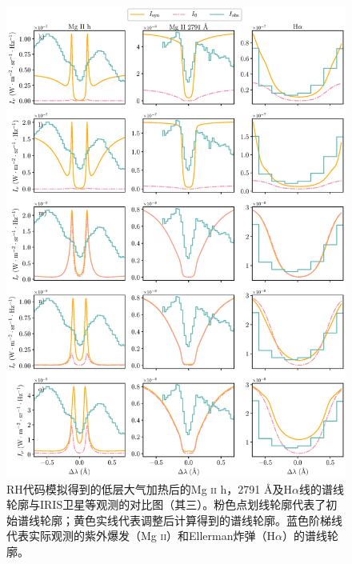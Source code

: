 \begin{figure}
	\centering
	\includegraphics[width=\textwidth]{figs/UVB_spec_3}
	\caption{RH代码模拟得到的低层大气加热后的Mg \textsc{ii} h，2791 \mbox{\AA}及H$\alpha$线的谱线轮廓与IRIS卫星等观测的对比图（其三）。粉色点划线轮廓代表了初始谱线轮廓；黄色实线代表调整后计算得到的谱线轮廓。蓝色阶梯线代表实际观测的紫外爆发（Mg \textsc{ii}）和Ellerman炸弹（H$\alpha$）的谱线轮廓。}
	\label{fig:5.4}
\end{figure}
